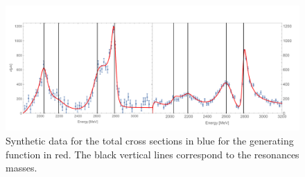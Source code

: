 \documentclass[aps, prd, twocolumn, showpacs, superscriptaddress,
preprintnumbers, nofootinbib]{revtex4-1}
\begin{document}
\begin{figure}
\begin{center}
\includegraphics[width=.99\linewidth]{Fig1.pdf}
\caption{Synthetic data for the total cross sections in blue for the generating function in red. The black vertical lines correspond to the resonances masses.}
\label{fig:Fig2}
\end{center}
\end{figure}
\end{document}

